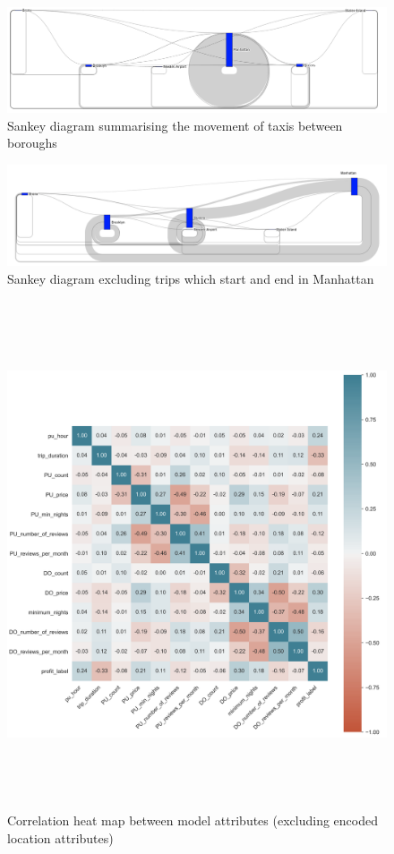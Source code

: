 \documentclass[11pt]{article}
\begin{document}
\begin{figure}[hbt!]
 \centering
 \includegraphics[scale=0.4]{plots/sankey.png}
 \caption{Sankey diagram summarising the movement of taxis between boroughs}
\end{figure}

\begin{figure}[hbt!]
 \centering
 \includegraphics[scale=0.42]{plots/sankey_exc.png}
 \caption{Sankey diagram excluding trips which start and end in Manhattan}
\end{figure}


\begin{figure}[hbt!]
 \centering
 \includegraphics[width=16cm,height=15cm]{plots/correlation.png}
 \caption{Correlation heat map between model attributes (excluding encoded location attributes)}
\end{figure}
\end{document}
